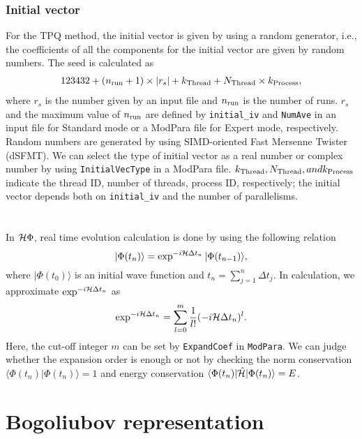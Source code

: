 \subsubsection*{Initial vector}
For the TPQ method, the initial vector is given by using a random generator, i.e., the coefficients of all the components for the initial vector are given by random numbers. The seed is calculated as 
\begin{align}
123432+(n_{\rm run}+1)\times  |r_s|+k_{\rm Thread}+N_{\rm Thread} \times k_{\rm Process},
\end{align}
where $r_s$ is the number given by an input file and $n_{\rm run}$ is the number of runs. $r_s$ and the maximum value of $n_{\rm run}$ are defined by \verb|initial_iv| and \verb|NumAve| in an input file for Standard mode or a ModPara file for Expert mode, respectively. Random numbers are generated by using SIMD-oriented Fast Mersenne Twister (dSFMT)\cite{Mutsuo2008}. We can select the type of initial vector as a real number or complex number by using \verb|InitialVecType| in a ModPara file.
$k_{\rm Thread}, N_{\rm Thread}, and k_{\rm Process}$ indicate 
the thread ID, number of threads, process ID, respectively;
the initial vector depends both on \verb|initial_iv| and the number of parallelisms.

\section{}
\label{Ch:TE}
In ${\cal H}\Phi$, real time evolution calculation is done by using the following relation
\begin{equation}
|\Phi (t_n)\rangle = \exp^{-i {\cal H}  \Delta t_n}|\Phi (t_{n-1})\rangle,
\end{equation}
where $|\Phi(t_0)\rangle$ is an initial wave function and $t_n = \sum_{j=1}^n  \Delta t_j $.
In calculation, we approximate $\exp^{-i {\cal H}  \Delta t_n}$ as
\begin{equation}
\exp^{-i {\cal H}  \Delta t_n} =\sum_{l=0}^m \frac{1}{l!}(-i {\cal H}  \Delta t_n)^l .
\end{equation}
Here, the cut-off integer $m$ can be set by \verb|ExpandCoef| in \verb|ModPara|.
We can judge whether the expansion order is enough or not by checking the norm conservation $\langle \Phi (t_n)|\Phi (t_n)\rangle=1$ and energy conservation $\langle \Phi (t_n)|\hat{\cal H}|\Phi (t_n)\rangle=E$.

\section{Bogoliubov representation}\label{sec_bogoliubov_rep}

